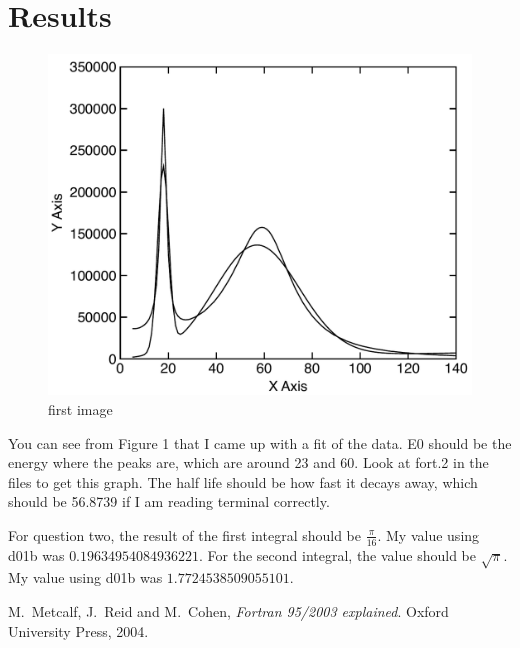 \documentclass[12pt]{article}
\begin{document}
\section{Results}

\begin {figure}[!htb]
	\includegraphics[width=1.\textwidth]{question_1/plot1.pdf}
	\caption{first image }
	\label{imageone}
\end {figure}

You can see from Figure 1 that I came up with a fit of the data. E0 should be the energy where the peaks are, which are around 23 and 60. Look at fort.2 in the files to get this graph. The half life should be how fast it decays away, which should be 56.8739 if I am reading terminal correctly.

For question two, the result of the first integral should be $\frac{\pi}{16}$. My value using d01b was $0.19634954084936221$.  For the second integral, the value should be $\sqrt{\pi}$. My value using d01b was $1.7724538509055101$.





\begin{thebibliography}{}


 M.\ Metcalf, J.\ Reid and M.\ Cohen, {\it Fortran 95/2003 explained}. Oxford University Press, 2004.
 

\end{thebibliography}
\end{document}
